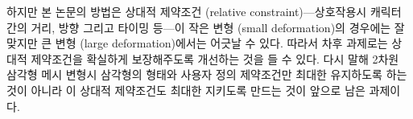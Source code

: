 \documentclass[12pt,a4paper,oneside,final]{report}
\begin{document}
하지만 본 논문의 방법은 상대적 제약조건 (relative constraint)---상호작용시
캐릭터 간의 거리, 방향 그리고 타이밍 등---이 작은 변형 (small deformation)의
경우에는 잘 맞지만 큰 변형 (large deformation)에서는 어긋날 수 있다.  따라서
차후 과제로는 상대적 제약조건을 확실하게 보장해주도록 개선하는 것을 들 수 있다.
다시 말해 2차원 삼각형 메시 변형시 삼각형의 형태와 사용자 정의 제약조건만
최대한 유지하도록 하는 것이 아니라 이 상대적 제약조건도 최대한 지키도록 만드는
것이 앞으로 남은 과제이다.

\printbibliography
\end{document}
